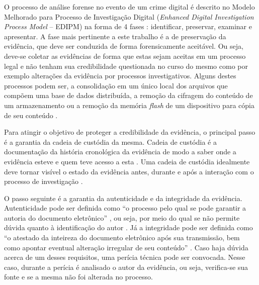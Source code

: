 O processo de análise forense no evento de um crime digital é descrito no Modelo Melhorado para Processo de Investigação Digital (\textit{Enhanced Digital Investigation Process Model} -- EDIPM) na forma de 4 fases \cite{GrisposChallengesCloudComputing:2012}: identificar, preservar, examinar e apresentar.
%
A fase mais pertinente a este trabalho é a de preservação da evidência, que deve ser conduzida de forma forensicamente aceitável.
%
Ou seja, deve-se coletar as evidências de forma que estas sejam aceitas em um processo legal e não tenham sua credibilidade questionada no curso do mesmo como por exemplo alterações da evidência por processos investigativos.
%
Alguns destes processos podem ser, a consolidação em um único local dos arquivos que compõem uma base de dados distribuída, a remoção da cifragem do conteúdo de um armazenamento ou a remoção da memória \textit{flash} de um dispositivo para cópia de seu conteúdo \cite{LuisDigitalChainOfCustody:2016}.
%

Para atingir o objetivo de proteger a credibilidade da evidência, o principal passo é a garantia da cadeia de custódia da mesma.
%
Cadeia de custódia é a documentação da história cronológica da evidência de modo a saber onde a evidência esteve e quem teve acesso a esta \cite[p.~21]{Ramos:2011}. 
%
Uma cadeia de custódia idealmente deve tornar visível o estado da evidência antes, durante e após a interação com o processo de investigação \cite{LuisDigitalChainOfCustody:2016}.
%
%


O passo seguinte é a garantia da autenticidade e da integridade da evidência.
%
Autenticidade pode ser definida como ``o processo pelo qual se pode garantir a autoria do documento eletrônico'' \cite{Ramos:2011}, ou seja, por meio do qual se não permite dúvida quanto à identificação do autor .
%
Já a integridade pode ser definida como ``o atestado da inteireza do documento eletrônico após sua transmissão, bem como apontar eventual alteração irregular de seu conteúdo'' \cite{Ramos:2011}. 
%
Caso haja dúvida acerca de um desses requisitos, uma perícia técnica pode ser convocada.
%
Nesse caso, durante a perícia é analisado o autor da evidência, ou seja, verifica-se sua fonte e se a mesma não foi alterada no processo.


